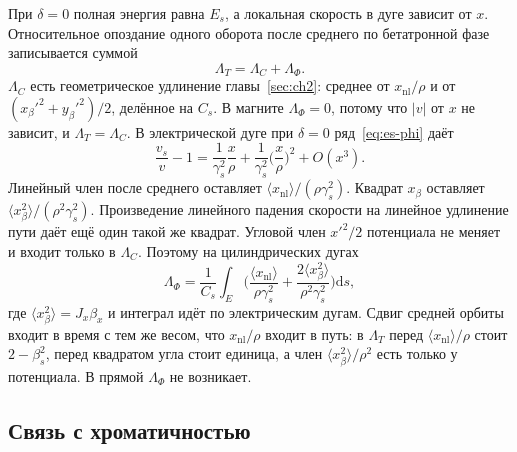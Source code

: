\documentclass[aps,pra,preprint,a4paper,amsmath,amssymb,longbibliography]{revtex4-2}
\begin{document}
При $\delta=0$ полная энергия равна $E_s$, а локальная скорость в дуге зависит от $x$. Относительное опоздание одного оборота после среднего по бетатронной фазе записывается суммой
\begin{equation}
\label{eq:es-LT}
\Lambda_T=\Lambda_C+\Lambda_\Phi.
\end{equation}
$\Lambda_C$ есть геометрическое удлинение главы~\ref{sec:ch2}: среднее от $x_{\mathrm{nl}}/\rho$ и от $(x_\beta'^2+y_\beta'^2)/2$, делённое на $C_s$. В магните $\Lambda_\Phi=0$, потому что $|v|$ от $x$ не зависит, и $\Lambda_T=\Lambda_C$. В электрической дуге при $\delta=0$ ряд~\eqref{eq:es-phi} даёт
\begin{equation}
\label{eq:es-v-beta}
\frac{v_s}{v}-1
=\frac{1}{\gamma_s^2}\frac{x}{\rho}
+\frac{1}{\gamma_s^2}\Biggl(\frac{x}{\rho}\Biggr)^2
+O(x^3).
\end{equation}
Линейный член после среднего оставляет $\langle x_{\mathrm{nl}}\rangle/(\rho\gamma_s^2)$. Квадрат $x_\beta$ оставляет $\langle x_\beta^2\rangle/(\rho^2\gamma_s^2)$. Произведение линейного падения скорости на линейное удлинение пути даёт ещё один такой же квадрат. Угловой член $x'^2/2$ потенциала не меняет и входит только в $\Lambda_C$. Поэтому на цилиндрических дугах
\begin{equation}
\label{eq:es-Lphi}
\Lambda_\Phi
=\frac{1}{C_s}
\int_{E}
\Biggl(
\frac{\langle x_{\mathrm{nl}}\rangle}{\rho\gamma_s^2}
+\frac{2\langle x_\beta^2\rangle}{\rho^2\gamma_s^2}
\Biggr)\mathrm{d}s,
\end{equation}
где $\langle x_\beta^2\rangle=J_x\beta_x$ и интеграл идёт по электрическим дугам. Сдвиг средней орбиты входит в время с тем же весом, что $x_{\mathrm{nl}}/\rho$ входит в путь: в $\Lambda_T$ перед $\langle x_{\mathrm{nl}}\rangle/\rho$ стоит $2-\beta_s^2$, перед квадратом угла стоит единица, а член $\langle x_\beta^2\rangle/\rho^2$ есть только у потенциала. В прямой $\Lambda_\Phi$ не возникает.

\subsection{Связь с хроматичностью}
\label{sec:es-xi}
\end{document}
